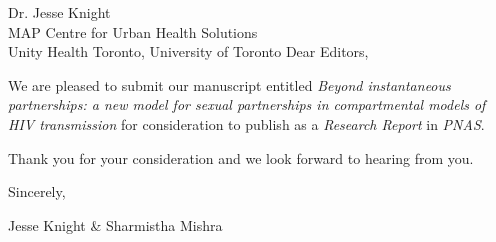 \address{
  Dr. May R. Berenbaum\\
  Editor-in-Chief\\
  Proceedings of the National Academy of Sciences
}{Dr. Jesse Knight\\
  MAP Centre for Urban Health Solutions\\
  Unity Health Toronto, University of Toronto}
Dear Editors,
\par
We are pleased to submit our manuscript entitled
\emph{Beyond instantaneous partnerships:
  a new model for sexual partnerships in compartmental models of HIV transmission}
for consideration to publish as a \emph{Research Report} in \emph{PNAS}.
\par
\par
Thank you for your consideration and we look forward to hearing from you.
\medskip\par
Sincerely,
\par
Jesse Knight \& Sharmistha Mishra
